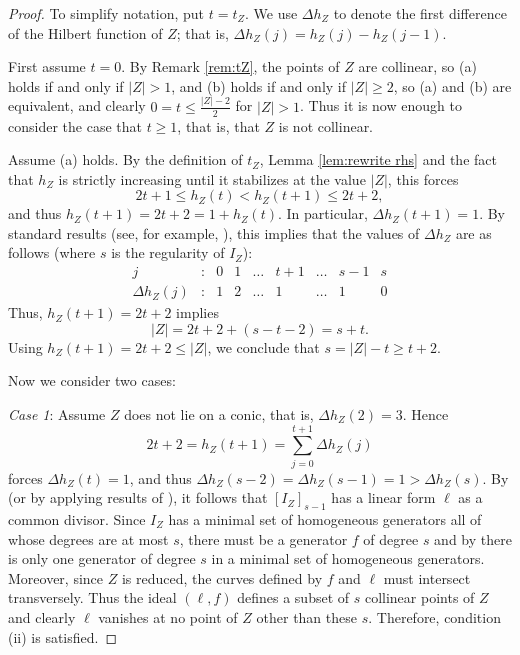 \documentclass[12pt]{amsart}
\numberwithin{equation}{section}
\theoremstyle{definition}
\begin{document}
\begin{proof}
To simplify notation, put $t = t_Z$. 
We  use $\Delta h_Z$ to denote the first difference of the Hilbert function of $Z$; that is, 
$\Delta h_Z (j) = h_Z (j) - h_Z (j-1)$. 

First assume $t =0$. By Remark \ref{rem:tZ}, the points of $Z$ are collinear, so
(a) holds if and only if $|Z|>1$, and (b) holds if and only if $|Z|\geq 2$, so (a) and (b)
are equivalent, and clearly $0=t \le \frac{|Z| -2}{2}$ for $|Z|>1$. Thus it is now enough to consider the case that 
$t \ge 1$, that is, that $Z$ is not collinear. 

Assume (a) holds. By the definition of $t_Z$, Lemma \ref{lem:rewrite rhs} and the fact that $h_Z$ is strictly increasing
until it stabilizes at the value $|Z|$, this forces 
\[
2 t + 1 \le h_Z (t) < h_Z (t + 1) \le 2 t + 2,  
\]
and thus $h_Z (t + 1) = 2 t + 2 = 1 + h_Z (t)$. In particular, $\Delta h_Z (t + 1) = 1$. 
By standard results (see, for example, \cite[Proposition 3.9]{DGM}), this 
implies that the values of $\Delta h_Z$ are as follows (where $s$ is the regularity of $I_Z$): 
\[
\begin{array}{ccccccccc}
j                      & :  & 0 & 1 & \ldots & t+1 & \ldots & s-1 & s\\
\Delta h_Z(j) & :  & 1 & 2 & \ldots & 1    & \ldots & 1 & 0
\end{array}
\]
Thus, $h_Z (t + 1) = 2 t + 2$ implies
\[
|Z| = 2 t + 2 + (s - t - 2) = s + t. 
\]
Using $h_Z (t + 1) = 2 t + 2 \le |Z|$, we conclude that $s = |Z| - t \ge t + 2$.

Now we consider two cases: 

\emph{Case 1}: Assume $Z$ does not lie on a  conic, that is, $\Delta h_Z (2) = 3$. Hence 
\[
2 t + 2 =  h_Z (t + 1) = \sum_{j=0}^{t+1} \Delta h_Z (j)
\]
forces $\Delta h_Z (t) = 1$, and thus $\Delta h_Z (s-2) = \Delta h_Z (s-1) = 1 > \Delta h_Z (s)$. 
By \cite[(2.3)]{Da} (or by applying results of \cite{BGM}), it follows that $[I_Z]_{s-1}$ has a linear form $\ell$ 
as a common divisor. Since $I_Z$ has a minimal set of homogeneous generators all of whose degrees are
at most $s$, there must be a generator $f$ of degree $s$ and by
\cite[Theorem 2.1]{Camp} there is only one generator of degree $s$ in a minimal set of homogeneous generators.
Moreover, since $Z$ is reduced, the curves defined by $f$ and $\ell$ must intersect transversely.
Thus the ideal $(\ell, f)$ defines a subset of $s$ collinear points of $Z$ and clearly $\ell$ vanishes at no point of $Z$
other than these $s$. Therefore, condition (ii) is satisfied. 


\end{proof}
\end{document}
